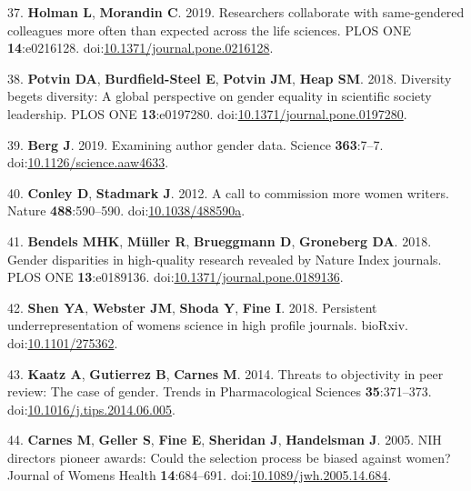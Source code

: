 \documentclass[11pt,]{article}
\begin{document}
\hypertarget{ref-holman_researchers_2019}{}
37. \textbf{Holman L}, \textbf{Morandin C}. 2019. Researchers
collaborate with same-gendered colleagues more often than expected
across the life sciences. PLOS ONE \textbf{14}:e0216128.
doi:\href{https://doi.org/10.1371/journal.pone.0216128}{10.1371/journal.pone.0216128}.

\hypertarget{ref-potvin_diversity_2018}{}
38. \textbf{Potvin DA}, \textbf{Burdfield-Steel E}, \textbf{Potvin JM},
\textbf{Heap SM}. 2018. Diversity begets diversity: A global perspective
on gender equality in scientific society leadership. PLOS ONE
\textbf{13}:e0197280.
doi:\href{https://doi.org/10.1371/journal.pone.0197280}{10.1371/journal.pone.0197280}.

\hypertarget{ref-berg_examining_2019}{}
39. \textbf{Berg J}. 2019. Examining author gender data. Science
\textbf{363}:7--7.
doi:\href{https://doi.org/10.1126/science.aaw4633}{10.1126/science.aaw4633}.

\hypertarget{ref-conley_call_2012-1}{}
40. \textbf{Conley D}, \textbf{Stadmark J}. 2012. A call to commission
more women writers. Nature \textbf{488}:590--590.
doi:\href{https://doi.org/10.1038/488590a}{10.1038/488590a}.

\hypertarget{ref-bendels_gender_2018}{}
41. \textbf{Bendels MHK}, \textbf{Müller R}, \textbf{Brueggmann D},
\textbf{Groneberg DA}. 2018. Gender disparities in high-quality research
revealed by Nature Index journals. PLOS ONE \textbf{13}:e0189136.
doi:\href{https://doi.org/10.1371/journal.pone.0189136}{10.1371/journal.pone.0189136}.

\hypertarget{ref-Shen275362}{}
42. \textbf{Shen YA}, \textbf{Webster JM}, \textbf{Shoda Y},
\textbf{Fine I}. 2018. Persistent underrepresentation of womens science
in high profile journals. bioRxiv.
doi:\href{https://doi.org/10.1101/275362}{10.1101/275362}.

\hypertarget{ref-Kaatz2014}{}
43. \textbf{Kaatz A}, \textbf{Gutierrez B}, \textbf{Carnes M}. 2014.
Threats to objectivity in peer review: The case of gender. Trends in
Pharmacological Sciences \textbf{35}:371--373.
doi:\href{https://doi.org/10.1016/j.tips.2014.06.005}{10.1016/j.tips.2014.06.005}.

\hypertarget{ref-Carnes2005}{}
44. \textbf{Carnes M}, \textbf{Geller S}, \textbf{Fine E},
\textbf{Sheridan J}, \textbf{Handelsman J}. 2005. NIH directors pioneer
awards: Could the selection process be biased against women? Journal of
Womens Health \textbf{14}:684--691.
doi:\href{https://doi.org/10.1089/jwh.2005.14.684}{10.1089/jwh.2005.14.684}.
\end{document}
